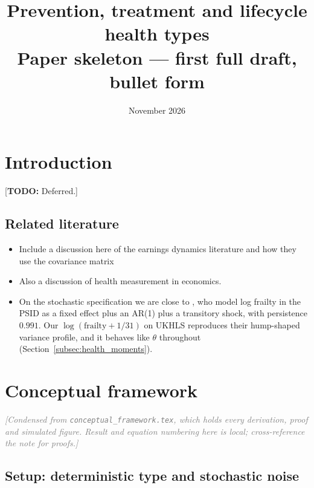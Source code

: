\documentclass[11pt]{article}
\title{Prevention, treatment and lifecycle health types\\[4pt]
	\large Paper skeleton --- first full draft, bullet form}
\author{}
\date{November 2026}
\newcommand{\todo}[1]{\textcolor{red!75!black}{[\textbf{TODO:} #1]}}
\newcommand{\note}[1]{\textcolor{gray}{\textit{[#1]}}}
\newcommand{\code}[1]{\texttt{\small #1}}
\begin{document}
	\maketitle
	
	
	\section{Introduction}
	\todo{Deferred.}
	
	
	\subsection{Related literature}
	
	\begin{itemize}
		\item Include a discussion here of the earnings dynamics literature and how they use the covariance matrix
		\item Also a discussion of health measurement in economics. 
		\item On the stochastic specification we are close to \citet{hosseini2022}, who model log frailty in the PSID as a fixed effect plus an AR(1) plus a transitory shock, with persistence $0.991$. Our $\log(\text{frailty}+1/31)$ on UKHLS reproduces their hump-shaped variance profile, and it behaves like $\theta$ throughout (Section~\ref{subsec:health_moments}).
	\end{itemize}
	
	\section{Conceptual framework}
	\label{sec:framework}
	\note{Condensed from \code{conceptual\_framework.tex}, which holds every derivation, proof and simulated figure. Result and equation numbering here is local; cross-reference the note for proofs.}
	
	\subsection{Setup: deterministic type and stochastic noise}
	
\end{document}
